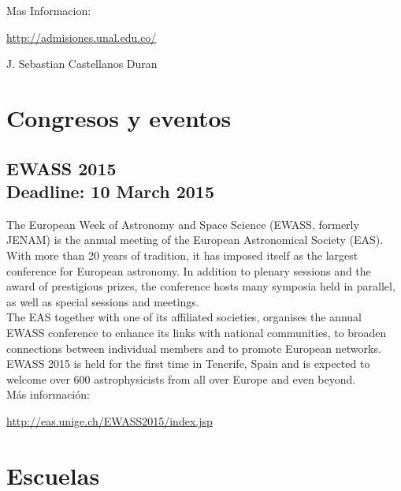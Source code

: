 \documentclass{book}
\begin{document}
Mas Informacion:
\begin{center}
\url{http://admisiones.unal.edu.co/}
\end{center}


\begin{flushright}
J. Sebastian Castellanos Duran
\end{flushright}

\section*{Congresos y eventos}

\subsection{EWASS 2015\\ Deadline: 10 March 2015}

The European Week of Astronomy and Space Science (EWASS, formerly JENAM) is the annual meeting of the European Astronomical Society (EAS). With more than 20 years of tradition, it has imposed itself as the largest conference for European astronomy. In addition to plenary sessions and the award of prestigious prizes, the conference hosts many symposia held in parallel, as well as special sessions and meetings.\\

\noindent The EAS together with one of its affiliated societies, organises the annual EWASS conference to enhance its links with national communities, to broaden connections between individual members and to promote European networks.\\

\noindent EWASS 2015 is held for the first time in Tenerife, Spain and is expected to welcome over 600 astrophysicists from all over Europe and even beyond.\\

\noindent Más información:
\begin{center}
\url{ http://eas.unige.ch/EWASS2015/index.jsp}
\end{center}

\newpage
{}
                   \section*{Escuelas}
\end{document}
